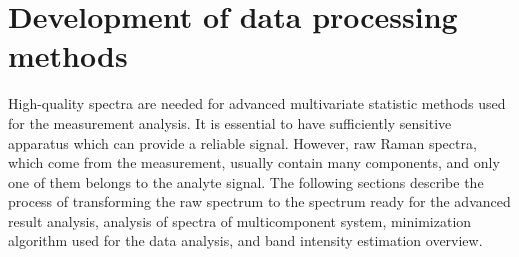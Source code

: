 \section{Development of data processing methods}
\label{data_processing}

High-quality spectra are needed for advanced multivariate statistic methods
used for the measurement analysis.
It is essential to have sufficiently sensitive apparatus which can provide a
reliable signal.
However, raw Raman spectra, which come from the measurement, usually contain
many components, and only one of them belongs to the analyte signal.
The following sections describe the process of transforming the raw spectrum
to the spectrum ready for the advanced result analysis, analysis
of spectra of multicomponent system, minimization algorithm used for the
data analysis, and band intensity estimation overview.








